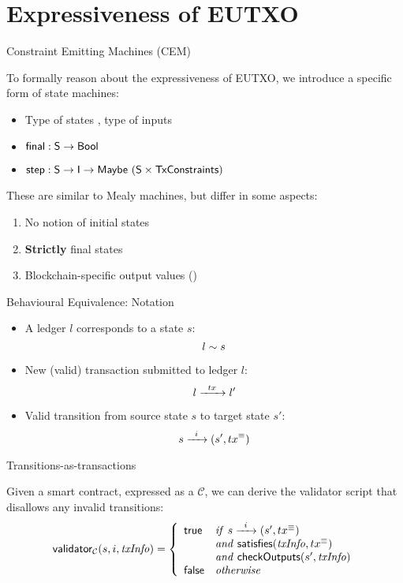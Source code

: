 \section{Expressiveness of EUTXO}

\begin{frame}{Constraint Emitting Machines (CEM)}

To formally reason about the expressiveness of EUTXO, we introduce a specific form of state machines:
\begin{itemize}
\item Type of states , type of inputs 
\item $\textsf{final} : \textsf{S} \rightarrow \textsf{Bool}$
\item $\textsf{step} : \textsf{S} \rightarrow \textsf{I} \rightarrow \textsf{Maybe}\ (\textsf{S} \times \textsf{TxConstraints})$
\end{itemize}

These are similar to Mealy machines, but differ in some aspects:
\begin{enumerate}
\item No notion of initial states
\item \textbf{Strictly} final states
\item Blockchain-specific output values ()
\end{enumerate}

\end{frame}

\begin{frame}{Behavioural Equivalence: Notation}

\begin{itemize}
\item A ledger $l$ corresponds to a \CEM{} state $s$:
\[
 l \sim s 
\]
\item New (valid) transaction submitted to ledger $l$:
\[
 l \xrightarrow{\hspace{5pt} tx \hspace{5pt}} l' 
\]
\item Valid \CEM{} transition from source state $s$ to target state $s'$:
\[
 s \xrightarrow{\hspace{5pt} i \hspace{5pt}} (s' , tx^\equiv) 
\]
\end{itemize}

\end{frame}

\begin{frame}{Transitions-as-transactions}

Given a smart contract, expressed as a \CEM{} $\mathcal{C}$,
we can derive the validator script that disallows any invalid transitions:
\[
\mathsf{validator}_\mathcal{C}(s, i, \mathit{txInfo}) = \left\{
  \begin{array}{lll}
  \textsf{true}  & \mathit{if} \  s \xrightarrow{\hspace{5pt} i \hspace{5pt}} (s' , tx^\equiv)  \\
         & \mathit{and} \ \mathsf{satisfies}(\mathit{txInfo}, tx^\equiv) \\
         & \mathit{and} \ \mathsf{checkOutputs}(s', \mathit{txInfo}) \\
  \textsf{false} & \mathit{otherwise}
  \end{array}
\right.
\]

\end{frame}

